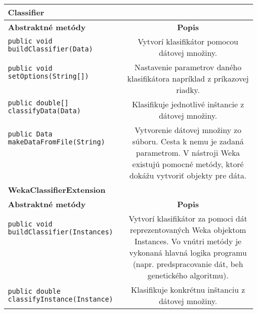 \begin{table}
\centering
\begin{tabular}{|l|c|}
\hline
\textbf{Classifier} & \\
\hline\hline
\textbf{Abstraktné metódy} & \textbf{Popis} \\
\hline
\verb|public void buildClassifier(Data)| & \multirow{2}{5cm}{Vytvorí klasifikátor pomocou dátovej množiny.} \\
& \\
\hline
\verb|public void setOptions(String[])| & \multirow{4}{5cm}{Nastavenie parametrov daného klasifikátora napríklad z príkazovej riadky.} \\
& \\
& \\ 
& \\ 
\hline
\verb|public double[] classifyData(Data)| & \multirow{3}{5cm}{Klasifikuje jednotlivé inštancie z dátovej množiny.} \\
& \\ 
& \\ 
\hline
\verb|public Data makeDataFromFile(String)| & \multirow{7}{5cm}{Vytvorenie dátovej množiny zo súboru. Cesta k nemu je zadaná parametrom. V nástroji Weka existujú pomocné metódy, ktoré dokážu vytvoriť objekty pre dáta.} \\
& \\ 
& \\ 
& \\ 
& \\ 
& \\
& \\ 
\hline
\hline
\textbf{WekaClassifierExtension} & \\
\hline\hline
\textbf{Abstraktné metódy} & \textbf{Popis} \\
\hline
\verb|public void buildClassifier(Instances)| & \multirow{8}{5cm}{Vytvorí klasifikátor za pomoci dát reprezentovaných Weka objektom Instances. Vo vnútri metódy je vykonaná hlavná logika programu (napr. predspracovanie dát, beh genetického algoritmu).} \\
& \\
& \\
& \\ 
& \\ 
& \\ 
& \\ 
& \\  
\hline
\verb|public double classifyInstance(Instance)| & \multirow{3}{5cm}{Klasifikuje konkrétnu inštanciu z dátovej množiny.} \\

\end{tabular}
\end{table}
